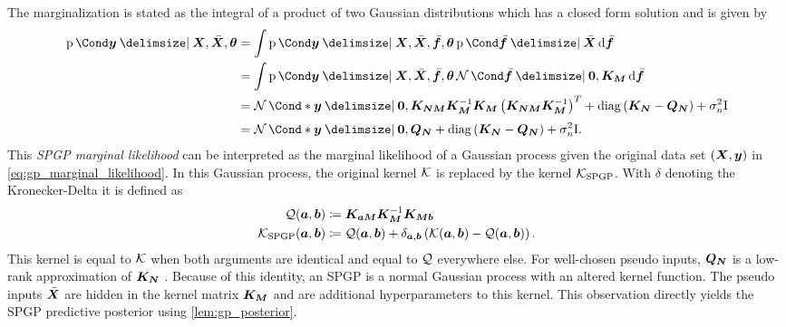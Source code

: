The marginalization is stated as the integral of a product of two Gaussian distributions which has a closed form solution and is given by
\begin{align}
    \Prob{\mat{y} \given \mat{X}, \ps{\mat{X}}, \mat{\theta}} &= \int \Prob{\mat{y} \given \mat{X}, \ps{\mat{X}}, \ps{\mat{f}}, \mat{\theta}} \Prob{\ps{\mat{f}} \given \ps{\mat{X}}} \diff \ps{\mat{f}} \\
    &= \int \Prob{\mat{y} \given \mat{X}, \ps{\mat{X}}, \ps{\mat{f}}, \mat{\theta}} \Gaussian{\ps{\mat{f}} \given \mat{0}, \mat{K_M}} \diff \ps{\mat{f}} \\
    &= \Gaussian*{\mat{y} \given \mat{0}, \mat{K_{NM}} \mat{K_M}^{-1} \mat{K_M} \left( \mat{K_{NM}} \mat{K_M}^{-1} \right)^T + \diag\left( \mat{K_N} - \mat{Q_N} \right) + \sigma_n^2 \Eye} \\
    &= \Gaussian*{\vphantom{\left( \mat{K_M}^{-1} \right)^T} \mat{y} \given \mat{0}, \mat{Q_N} + \diag\left( \mat{K_N} - \mat{Q_N} \right) + \sigma_n^2 \Eye}.
\end{align}
This \emph{SPGP marginal likelihood} can be interpreted as the marginal likelihood of a Gaussian process given the original data set $(\bm{X}, \bm{y})$ in \cref{eq:gp_marginal_likelihood}.
In this Gaussian process, the original kernel $\operatorname{\mathcal{K}}$ is replaced by the kernel $\operatorname{\mathcal{K}}_{\text{SPGP}}$.
With $\delta$ denoting the Kronecker-Delta it is defined as
\begin{align}
    \operatorname{\mathcal{Q}}(\bm{a}, \bm{b}) &\coloneqq \bm{K_{aM}} \bm{K_M}^{-1} \bm{K_{Mb}} \\
    \operatorname{\mathcal{K}}_{\text{SPGP}}(\bm{a}, \bm{b}) &\coloneqq \operatorname{\mathcal{Q}}(\bm{a}, \bm{b}) + \delta_{\bm{a}, \bm{b}} \left( \operatorname{\mathcal{K}}(\bm{a}, \bm{b}) - \operatorname{\mathcal{Q}}(\bm{a}, \bm{b}) \right).
\end{align}
This kernel is equal to $\operatorname{\mathcal{K}}$ when both arguments are identical and equal to $\operatorname{\mathcal{Q}}$ everywhere else.
For well-chosen pseudo inputs, $\bm{Q_N}$ is a low-rank approximation of $\bm{K_N}$ \cite{snelson_flexible_2007}.
Because of this identity, an SPGP is a normal Gaussian process with an altered kernel function.
The pseudo inputs $\bar{\bm{X}}$ are hidden in the kernel matrix $\bm{K_M}$ and are additional hyperparameters to this kernel.
This observation directly yields the SPGP predictive posterior using \cref{lem:gp_posterior}.
